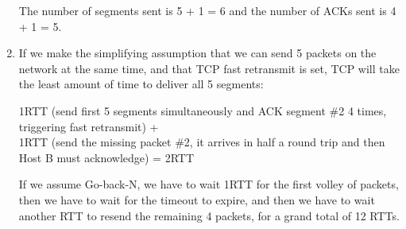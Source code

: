 \documentclass{report}
\begin{document}
\begin{problem}
\begin{answer}{30em}
\begin{enumerate}
          The number of segments sent is 5 + 1 = 6 and the number of ACKs sent
          is 4 + 1 = 5.

    \item If we make the simplifying assumption that we can send 5 packets on
          the network at the same time, and that TCP fast retransmit is set,
          TCP will take the least amount of time to deliver all 5 segments:

          1RTT (send first 5 segments simultaneously and ACK segment \#2 4
          times, triggering fast retransmit) + \\
          1RTT (send the missing packet \#2, it arrives in half a round trip and
          then Host B must acknowledge) =
          2RTT

          If we assume Go-back-N, we have to wait 1RTT for the first volley of
          packets, then we have to wait for the timeout to expire, and then
          we have to wait another RTT to resend the remaining 4 packets, for a
          grand total of 12 RTTs.
  \end{enumerate}
\end{answer}

\end{problem}
\end{document}
